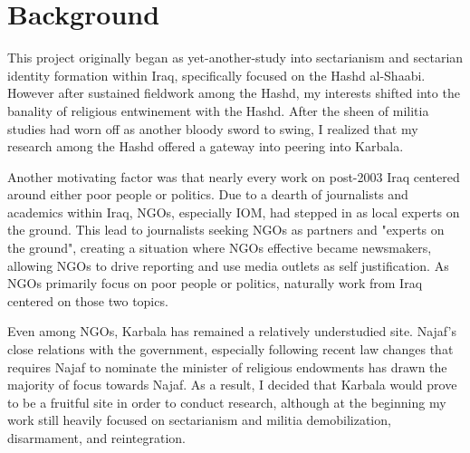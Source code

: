 



\section{Background}
This project originally began as yet-another-study into sectarianism and sectarian identity formation within Iraq, specifically focused on the Hashd al-Shaabi. However after sustained fieldwork among the Hashd, my interests shifted into the banality of religious entwinement with the Hashd. After the sheen of militia studies had worn off as another bloody sword to swing, I realized that my research among the Hashd offered a gateway into peering into Karbala. 

Another motivating factor was that nearly every work on post-2003 Iraq centered around either poor people or politics. Due to a dearth of journalists and academics within Iraq, NGOs, especially IOM, had stepped in as local experts on the ground. This lead to journalists seeking NGOs as partners and "experts on the ground", creating a situation where NGOs effective became newsmakers, allowing NGOs to drive reporting and use media outlets as self justification. As NGOs primarily focus on poor people or politics, naturally work from Iraq centered on those two topics.

Even among NGOs, Karbala has remained a relatively understudied site. Najaf's close relations with the government, especially following recent law changes that requires Najaf to nominate the minister of religious endowments \cite{hamoudi_engagements_2020} has drawn the majority of focus towards Najaf. As a result, I decided that Karbala would prove to be a fruitful site in order to conduct research, although at the beginning my work still heavily focused on sectarianism and militia demobilization, disarmament, and reintegration. 

